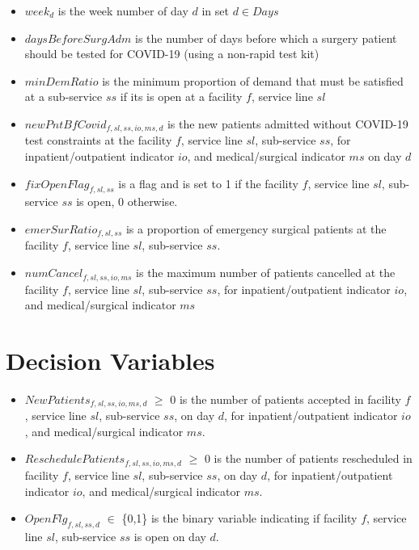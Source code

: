 \documentclass[10pt, letterpaper]{article}
\begin{document}
\begin{itemize}
\item[ ] $week_{d}$ is the week number of day $d$ in set $ d \in Days$
\item[ ] $daysBeforeSurgAdm$ is the number of days before which a surgery patient should be tested for COVID-19 (using a non-rapid test kit) 
\item[ ] $minDemRatio$ is the minimum proportion of demand that must be satisfied at a sub-service $ss$ if its is open at a facility $f$, service line $sl$ 
\item[ ] $newPntBfCovid_{f,sl,ss,io,ms,d}$ is the new patients admitted without COVID-19 test constraints at the facility $f$, service line $sl$, sub-service $ss$, for inpatient/outpatient indicator $io$, and medical/surgical indicator $ms$ on day $d$ 
\item[ ] $fixOpenFlag_{f,sl,ss}$ is a flag and is set to 1 if the facility $f$, service line $sl$, sub-service $ss$ is open, 0 otherwise. 
\item[ ] $emerSurRatio_{f,sl,ss}$ is a proportion of emergency surgical patients at the facility $f$, service line $sl$, sub-service $ss$. 
\item[ ] $numCancel_{f,sl,ss,io,ms}$ is the maximum number of patients cancelled at the facility $f$, service line $sl$, sub-service $ss$, for inpatient/outpatient indicator $io$, and medical/surgical indicator $ms$
\end{itemize}

\section*{Decision Variables}
\begin{itemize}
\item [ ] $NewPatients_{f,sl,ss,io,ms,d}$ $\geq$ {0} is the number of patients accepted in facility $f$, service line $sl$, sub-service $ss$, on day $d$, for inpatient/outpatient indicator $io$, and medical/surgical indicator $ms$.
\item [ ] $ReschedulePatients_{f,sl,ss,io,ms,d}$ $\geq$ {0} is the number of patients rescheduled in facility $f$, service line $sl$, sub-service $ss$, on day $d$, for inpatient/outpatient indicator $io$, and medical/surgical indicator $ms$.
\item [ ] $OpenFlg_{f,sl,ss,d}$ $\in$ \{0,1\} is the binary variable indicating if facility $f$, service line $sl$, sub-service $ss$ is open on day $d$.
\end{itemize}
\end{document}
